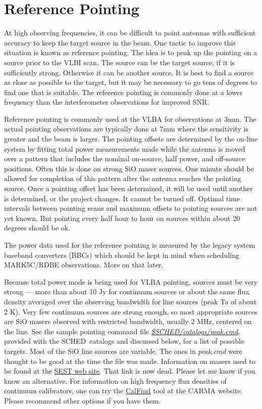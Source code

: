 \documentclass{report}
\newcommand{\schedb}{{\sc SCHED~}}
\begin{document}
\section{\label{SEC:REFPOINT}Reference Pointing}

At high observing frequencies, it can be difficult to point antennas with
sufficient accuracy to keep the target source in the beam.  One tactic to
improve this situation is known as reference pointing.  The idea is to
peak up the pointing on a source prior to the VLBI scan.  The source can
be the target source, if it is sufficiently strong.  Otherwise it can
be another source.  It is best to find a source as close as possible
to the target, but it may be necessary to go tens of degrees to find
one that is suitable.  The reference pointing is commonly done at a
lower frequency than the interferometer observations for improved SNR.

Reference pointing is commonly used at the VLBA for observations at
3mm.  The actual pointing observations are typically done at 7mm where
the sensitivity is greater and the beam is larger.  The pointing
offsets are determined by the on-line system by fitting total power
measurements made while the antenna is moved over a pattern that
includes the nominal on-source, half power, and off-source positions.
Often this is done on strong SiO maser sources.  One minute should be
allowed for completion of this pattern after the antenna reaches the
pointing source.  Once a pointing offset has been determined, it will
be used until another is determined, or the project changes.  It
cannot be turned off.  Optimal time intervals between pointing scans
and maximum offsets to pointing sources are not yet known.  But
pointing every half hour to hour on sources within about 20 degrees
should be ok.  

The power data used for the reference pointing is measured by the
legacy system baseband converters (BBCs) which should be kept in mind
when scheduling MARK5C/RDBE observations.  More on that later.

Because total power mode is being used for VLBA pointing, sources must
be very strong --- more than about 10 Jy for continuum sources or
about the same flux density averaged over the observing bandwidth for
line sources (peak Ta of about 2 K).  Very few continuum sources are
strong enough, so most appropriate sources are SiO masers observed
with restricted bandwidth, usually 2 MHz, centered on the line.  See
the sample pointing command file 
{\href{catalogs/peak.cmd}{{\sl \$SCHED/catalogs/peak.cmd}}},
provided with the
\schedb catalogs and discussed below, for a list of possible targets.
Most of the SiO line sources are variable.  The ones in {\sl peak.cmd}
were thought to be good at the time the file was made.  Information on
masers used to be found at the 
{\href{http://www.ls.eso.org/lasilla/Telescopes/SEST/html/telescope-calibration/index.html}{SEST web site}}.
That link is now dead.  Please let me know if you know an alternative.
For information on high frequency flux densities of continuum
calibrators, one can try the
{\href{http://carma.astro.umd.edu/cgi-bin/calfind.cgi}{CalFind}}
tool at the CARMA website.  Please recommend other options if you have
them.
\end{document}
